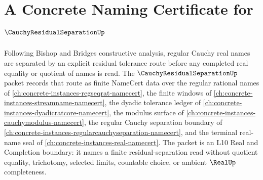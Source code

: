 \chapter{A Concrete Naming Certificate for $\CauchyResidualSeparationUp$}
\label{ch:concrete-instances-cauchy-residual-separation-namecert}

Following Bishop and Bridges constructive analysis, regular Cauchy real names are separated by an explicit residual tolerance route before any completed real equality or quotient of names is read. The $\CauchyResidualSeparationUp$ packet records that route as finite NameCert data over the regular rational names of \autoref{ch:concrete-instances-regseqrat-namecert}, the finite windows of \autoref{ch:concrete-instances-streamname-namecert}, the dyadic tolerance ledger of \autoref{ch:concrete-instances-dyadicratcore-namecert}, the modulus surface of \autoref{ch:concrete-instances-cauchymodulus-namecert}, the regular Cauchy separation boundary of \autoref{ch:concrete-instances-regularcauchyseparation-namecert}, and the terminal real-name seal of \autoref{ch:concrete-instances-real-namecert}. The packet is an L10 Real and Completion boundary: it names a finite residual-separation read without quotient equality, trichotomy, selected limits, countable choice, or ambient $\RealUp$ completeness.


